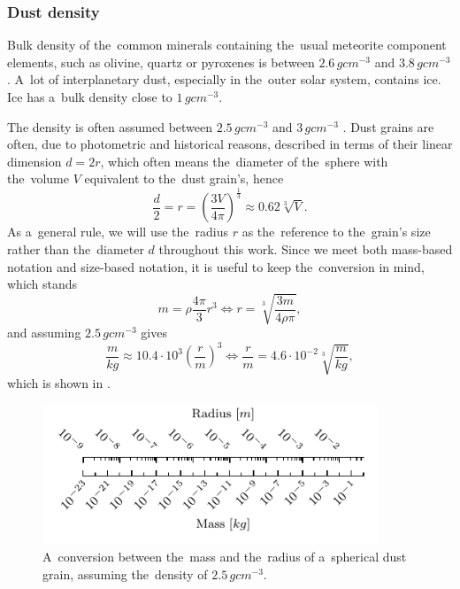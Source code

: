 \subsubsection{Dust density} \label{sec:density}

Bulk density of the~common minerals containing the~usual meteorite component elements, such as olivine, quartz or pyroxenes is between $2.6 \, \si{g cm^{-3}}$ and $3.8 \, \si{g cm^{-3}}$ \citep{duda1986minerals}. A~lot of interplanetary dust, especially in the~outer solar system, contains ice. Ice has a~bulk density close to $1 \, \si{g cm^{-3}}$.

The density is often assumed between $2.5 \, \si{g cm^{-3}}$ \citep{mann2014dust} and $3 \, \si{g cm^{-3}}$ \citep{mcdonnell1984cosmic}. Dust grains are often, due to photometric and historical reasons, described in terms of their linear dimension $d = 2r$, which often means the~diameter of the~sphere with the~volume $V$ equivalent to the~dust grain's, hence
\begin{equation}
    \frac{d}{2} = r = \left( {\frac{3V}{4\pi}} \right)^{\frac{1}{3}} \approx 0.62 \sqrt[3]{V}.
\end{equation}
As a~general rule, we will use the~radius $r$ as the~reference to the~grain's size rather than the~diameter $d$ throughout this work. Since we meet both mass-based notation and size-based notation, it is useful to keep the~conversion in mind, which stands
\begin{equation}
    m = \rho \frac{4\pi}{3} r^3 \Leftrightarrow r = \sqrt[3]{\frac{3 m}{4 \rho \pi}},
    \label{eq:density}
\end{equation}
and assuming $2.5 \, \si{g cm^{-3}}$ gives
\begin{equation}
    \frac{m}{\si{kg}} \approx 10.4 \cdot 10^3 \left(\frac{r}{\si{m}}\right)^3 
\Leftrightarrow 
    \frac{r}{\si{m}} = 4.6 \cdot 10^{-2} \sqrt[3]{\frac{m}{\si{kg}}},
\end{equation}
which is shown in .

\begin{figure}[ht]
 	\centering
 	\includegraphics[width=10cm]{figures/mass_size_ruler.pdf}
 	\caption{A~conversion between the~mass and the~radius of a~spherical dust grain, assuming the~density of $2.5 \, \si{g cm^{-3}}$.}
 	\label{fig:mass_size_ruler}
\end{figure}

